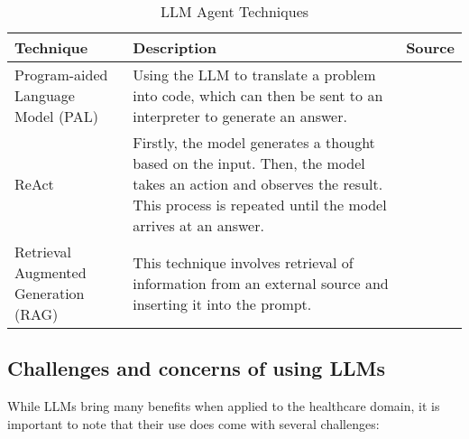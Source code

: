 \begin{table}[h!]
    \centering
    \begin{tabular}{p{3cm} p{8cm} p{2cm}}
        \toprule
        \textbf{Technique} & \textbf{Description} & \textbf{Source} \\
        \midrule
        \raggedright
        Program-aided Language Model (PAL) & Using the LLM to translate a problem into code, which can then be sent to an interpreter to generate an answer. & \textcite{pal} \\
        \hline
        \raggedright
        ReAct & Firstly, the model generates a thought based on the input. Then, the model takes an action and observes the result. This process is repeated until the model arrives at an answer. & \textcite{react-llm} \\
        \hline
        \raggedright
        Retrieval Augmented Generation (RAG) & This technique involves retrieval of information from an external source and inserting it into the prompt. & \textcite{rag} \\
        \bottomrule
    \end{tabular}
    \caption{LLM Agent Techniques}
    \label{tab:agents}
\end{table}

\FloatBarrier

\subsection{Challenges and concerns of using LLMs}

While LLMs bring many benefits when applied to the healthcare domain, it is important to note that their use does come with several challenges:

